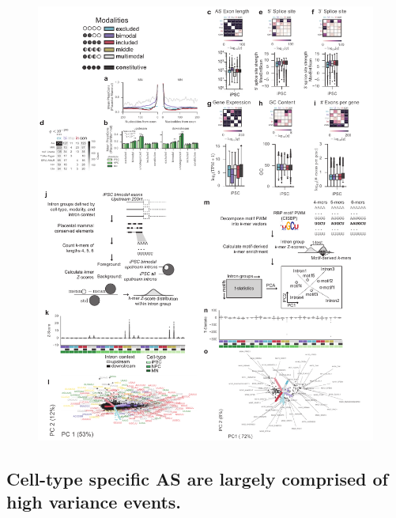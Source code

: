 \begin{figure}[h]
\ContinuedFloat
\captionsetup{labelformat=empty}
\centering
\includegraphics[width=5.8in]{figures/modality_features_supplementary.pdf}
\end{figure}
\clearpage


\subsection{Cell-type specific AS are largely comprised of high variance events.}

